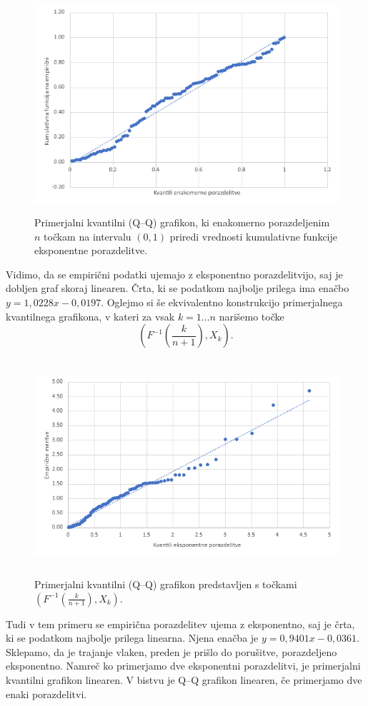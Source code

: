 \documentclass{article}
\begin{document}
\begin{figure}[H]
    \includegraphics[height=8cm]{qq-1.png}
    \caption{Primerjalni kvantilni (Q--Q) grafikon, ki enakomerno porazdeljenim $n$ točkam na intervalu $(0, 1)$ priredi vrednosti kumulativne funkcije eksponentne porazdelitve.}
\end{figure}
Vidimo, da se empirični podatki ujemajo z eksponentno porazdelitvijo, saj je dobljen graf
skoraj linearen. Črta, ki se podatkom najbolje prilega ima enačbo $y = 1{,}0228 x - 0{,}0197$.
Oglejmo si še ekvivalentno konstrukcijo primerjalnega kvantilnega grafikona, 
v kateri za vsak $k = 1 \dots n$ narišemo točke
$$ \left( F^{-1} \left( \frac{k}{n+1}\right), X_k \right) \text{.}$$
\begin{figure}[H]
    \includegraphics[height=8cm]{qq-2.png}
    \caption{Primerjalni kvantilni (Q--Q) grafikon predstavljen s točkami $ \left( F^{-1} \left( \frac{k}{n+1}\right), X_k \right)$.}
\end{figure}
Tudi v tem primeru se empirična porazdelitev ujema z eksponentno, saj je črta, ki se podatkom najbolje 
prilega linearna. Njena enačba je $y = 0{,}9401 x - 0{,}0361$. Sklepamo, da je trajanje vlaken, 
preden je prišlo do porušitve, porazdeljeno eksponentno.
Namreč ko primerjamo dve eksponentni porazdelitvi, je primerjalni kvantilni grafikon linearen. V bistvu 
je Q--Q grafikon linearen, če primerjamo dve enaki porazdelitvi. 
\end{document}
